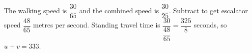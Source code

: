 The walking speed is $\dfrac{30}{65}$ and the combined speed is $\dfrac{30}{25}$. Subtract to get escalator speed $\dfrac{48}{65}$ metres per second. Standing travel time is $\dfrac{30}{\dfrac{48}{65}}=\dfrac{325}{8}$ seconds, so $\boxed{u+v=333}$.
